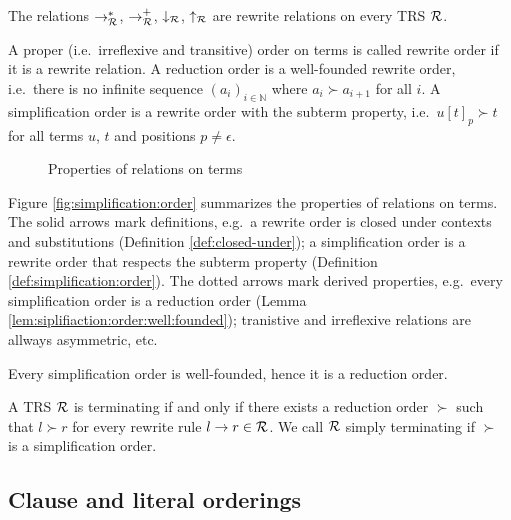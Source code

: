 \begin{lemma}
	The relations $\rightarrow^*_{\mathcal{R}}$,
	$\rightarrow^+_{\mathcal{R}}$,
	$\downarrow_{\mathcal{R}}$, $\uparrow_{\mathcal{R}}$ are rewrite relations on every TRS $\mathcal{R}$.
\end{lemma}
\begin{definition}\label{def:simplification:order}
	A proper (i.e.~irreflexive and transitive) order on terms is called {\myem rewrite order} if it is a rewrite relation.
	A {\myem reduction order} is a well-founded rewrite order,
	i.e.~there is no infinite sequence
	$(a_i)_{i\in\mathbb{N}}$
	where $a_i\succ a_{i+1}$ for all $i$.
	A {\myem simplification order} is a rewrite order with the {\myem subterm property},
	i.e.~$u[t]_p \succ t$ for all terms $u$, $t$ and positions $p\neq\epsilon$.
\end{definition}

\begin{figure}[htb]\label{fig:simplification:order}
	
	\caption{Properties of relations on terms}
\end{figure}

Figure \vref{fig:simplification:order} summarizes the properties of relations on terms.
The solid arrows mark definitions,
e.g.~a rewrite order is closed under contexts and substitutions (Definition \ref{def:closed-under});
a simplification order is a rewrite order
that respects the subterm property
(Definition \ref{def:simplification:order}).
The dotted arrows mark derived properties,
e.g.~every simplification order is a reduction order
(Lemma \ref{lem:siplifiaction:order:well:founded});
tranistive and irreflexive relations are allways asymmetric,
etc.

\begin{lemma}\label{lem:siplifiaction:order:well:founded}
	Every simplification order is well-founded, hence it is a reduction order.
\end{lemma}

\begin{theorem}
	A TRS $\mathcal{R}$ is terminating if and only if there exists a reduction order $\succ$
	such that $l\succ r$ for every rewrite rule $l\rightarrow r\in\mathcal{R}$.
	We call $\mathcal{R}$ simply terminating if $\succ$ is a simplification order.
\end{theorem}

\subsection{Clause and literal orderings}

